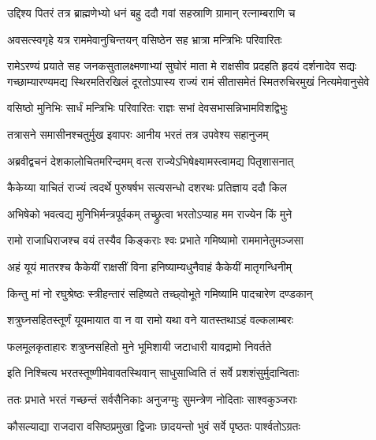 \twolineshloka
{उद्दिश्य पितरं तत्र ब्राह्मणेभ्यो धनं बहु}
{ददौ गवां सहस्राणि ग्रामान् रत्नाम्बराणि च} %

\twolineshloka
{अवसत्स्वगृहे यत्र राममेवानुचिन्तयन्}
{वसिष्ठेन सह भ्रात्रा मन्त्रिभिः परिवारितः} %

\fourlineindentedshloka
{रामेऽरण्यं प्रयाते सह जनकसुतालक्ष्मणाभ्यां सुघोरं}
{माता मे राक्षसीव प्रदहति हृदयं दर्शनादेव सद्यः}
{गच्छाम्यारण्यमद्य स्थिरमतिरखिलं दूरतोऽपास्य राज्यं}
{रामं सीतासमेतं स्मितरुचिरमुखं नित्यमेवानुसेवे} %





\twolineshloka
{वसिष्ठो मुनिभिः सार्धं मन्त्रिभिः परिवारितः}
{राज्ञः सभां देवसभासन्निभामविशद्विभुः} %

\twolineshloka
{तत्रासने समासीनश्चतुर्मुख इवापरः}
{आनीय भरतं तत्र उपवेश्य सहानुजम्} %

\twolineshloka
{अब्रवीद्वचनं देशकालोचितमरिन्दमम्}
{वत्स राज्येऽभिषेक्ष्यामस्त्वामद्य पितृशासनात्} %

\twolineshloka
{कैकेय्या याचितं राज्यं त्वदर्थे पुरुषर्षभ}
{सत्यसन्धो दशरथः प्रतिज्ञाय ददौ किल} %

\twolineshloka
{अभिषेको भवत्वद्य मुनिभिर्मन्त्रपूर्वकम्}
{तच्छ्रुत्वा भरतोऽप्याह मम राज्येन किं मुने} %

\twolineshloka
{रामो राजाधिराजश्च वयं तस्यैव किङ्कराः}
{श्वः प्रभाते गमिष्यामो राममानेतुमञ्जसा} %

\twolineshloka
{अहं यूयं मातरश्च कैकेयीं राक्षसीं विना}
{हनिष्याम्यधुनैवाहं कैकेयीं मातृगन्धिनीम्} %

\twolineshloka
{किन्तु मां नो रघुश्रेष्ठः स्त्रीहन्तारं सहिष्यते}
{तच्छ्वोभूते गमिष्यामि पादचारेण दण्डकान्} %

\twolineshloka
{शत्रुघ्नसहितस्तूर्णं यूयमायात वा न वा}
{रामो यथा वने यातस्तथाऽहं वल्कलाम्बरः} %

\twolineshloka
{फलमूलकृताहारः शत्रुघ्नसहितो मुने}
{भूमिशायी जटाधारी यावद्रामो निवर्तते} %

\twolineshloka
{इति निश्चित्य भरतस्तूष्णीमेवावतस्थिवान्}
{साधुसाध्विति तं सर्वे प्रशशंसुर्मुदान्विताः} %

\twolineshloka
{ततः प्रभाते भरतं गच्छन्तं सर्वसैनिकाः}
{अनुजग्मुः सुमन्त्रेण नोदिताः साश्वकुञ्जराः} %

\twolineshloka
{कौसल्याद्या राजदारा वसिष्ठप्रमुखा द्विजाः}
{छादयन्तो भुवं सर्वे पृष्ठतः पार्श्वतोऽग्रतः} %

